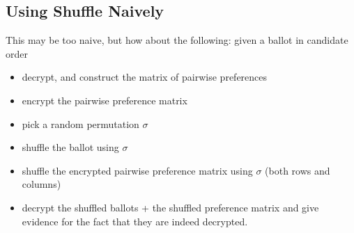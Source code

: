 \documentclass{llncs}
\begin{document}
\subsection{Using Shuffle Naively}

This may be too naive, but how about the following: given a ballot
in candidate order
\begin{itemize}
\item decrypt, and construct the matrix of pairwise preferences
\item encrypt the pairwise preference matrix
\item pick a random permutation $\sigma$ 
\item shuffle the ballot using $\sigma$
\item shuffle the encrypted pairwise preference matrix using
$\sigma$ (both rows and columns)
\item decrypt the shuffled ballots + the shuffled preference matrix
and give evidence for the fact that they are indeed decrypted.
\end{itemize}
\end{document}
